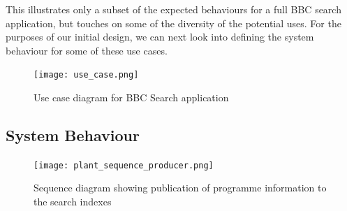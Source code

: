 \documentclass{llncs}
\begin{document}
This illustrates only a subset of the expected behaviours for a full
BBC search application, but touches on some of the diversity of the
potential uses. For the purposes of our initial design, we can next look
into defining the system behaviour for some of these use cases.

\begin{figure}
  \begin{center}
    \texttt{[image: use\_case.png]}
  \end{center}
  \caption{Use case diagram for BBC Search application\label{use-case}}
\end{figure}

\subsection{System Behaviour}

\begin{figure}[t]
  \begin{center}
    \texttt{[image: plant\_sequence\_producer.png]}
  \end{center}
  \caption{Sequence diagram showing publication of programme information to the search indexes\label{sequence-producer}}
\end{figure}
\end{document}
